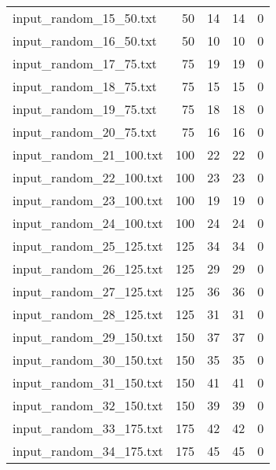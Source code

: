 \begin{table}[H]
\begin{tabular}{lrccc}
     input\_random\_15\_50.txt  &      50 &        14 &                 14 &               0 \\
     input\_random\_16\_50.txt  &      50 &        10 &                 10 &               0 \\
     input\_random\_17\_75.txt  &      75 &        19 &                 19 &               0 \\
     input\_random\_18\_75.txt  &      75 &        15 &                 15 &               0 \\
     input\_random\_19\_75.txt  &      75 &        18 &                 18 &               0 \\
     input\_random\_20\_75.txt  &      75 &        16 &                 16 &               0 \\
     input\_random\_21\_100.txt &     100 &        22 &                 22 &               0 \\
     input\_random\_22\_100.txt &     100 &        23 &                 23 &               0 \\
     input\_random\_23\_100.txt &     100 &        19 &                 19 &               0 \\
     input\_random\_24\_100.txt &     100 &        24 &                 24 &               0 \\
     input\_random\_25\_125.txt &     125 &        34 &                 34 &               0 \\
     input\_random\_26\_125.txt &     125 &        29 &                 29 &               0 \\
     input\_random\_27\_125.txt &     125 &        36 &                 36 &               0 \\
     input\_random\_28\_125.txt &     125 &        31 &                 31 &               0 \\
     input\_random\_29\_150.txt &     150 &        37 &                 37 &               0 \\
     input\_random\_30\_150.txt &     150 &        35 &                 35 &               0 \\
     input\_random\_31\_150.txt &     150 &        41 &                 41 &               0 \\
     input\_random\_32\_150.txt &     150 &        39 &                 39 &               0 \\
     input\_random\_33\_175.txt &     175 &        42 &                 42 &               0 \\
     input\_random\_34\_175.txt &     175 &        45 &                 45 &               0 \\

\end{tabular}
\end{table}
